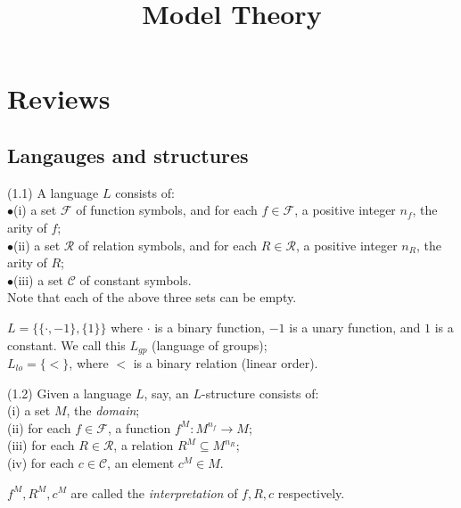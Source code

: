 \documentclass[a4paper]{article}
\begin{document}
\title{Model Theory}

\maketitle

\newpage

\tableofcontents

\newpage

\section{Reviews}

\subsection{Langauges and structures}

\begin{defi} (1.1)
A language $L$ consists of:\\
$\bullet$(i) a set $\mathcal{F}$ of function symbols, and for each $f \in \mathcal{F}$, a positive integer $n_f$, the arity of $f$;\\
$\bullet$(ii) a set $\mathcal{R}$ of relation symbols, and for each $R \in \mathcal{R}$, a positive integer $n_R$, the arity of $R$;\\
$\bullet$(iii) a set $\mathcal{C}$ of constant symbols.\\
Note that each of the above three sets can be empty.
\end{defi}

\begin{eg}
$L=\{\{\cdot,-1\},\{1\}\}$ where $\cdot$ is a binary function, $-1$ is a unary function, and $1$ is a constant. We call this $L_{gp}$ (language of groups);\\
$L_{lo} = \{<\}$, where $<$ is a binary relation (linear order).
\end{eg}

\begin{defi} (1.2)
Given a language $L$, say, an $L$-structure consists of:\\
(i) a set $M$, the \emph{domain};\\
(ii) for each $f \in \mathcal{F}$, a function $f^M:M^{n_f} \to M$;\\
(iii) for each $R \in \mathcal{R}$, a relation $R^M \subseteq M^{n_R}$;\\
(iv) for each $c \in \mathcal{C}$, an element $c^M \in M$.

$f^M,R^M,c^M$ are called the \emph{interpretation} of $f,R,c$ respectively.
\end{defi}
\end{document}
